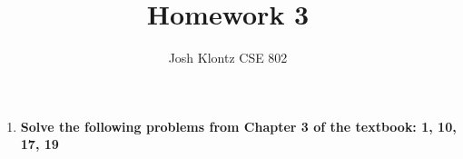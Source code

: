 \documentclass[12pt]{article}
\begin{document}
 
\title{Homework 3}
\author{Josh Klontz
CSE 802}
 
\maketitle

\begin{enumerate}
\item \textbf{Solve the following problems from Chapter 3 of the textbook: 1, 10, 17, 19}
 
\end{enumerate}
\end{document}
